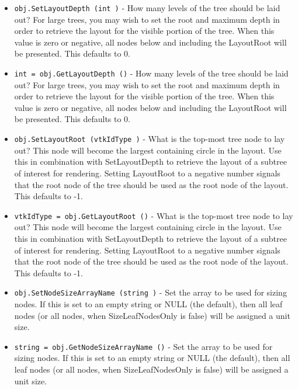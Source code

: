 \begin{itemize}
\item  \verb|obj.SetLayoutDepth (int )| -  How many levels of the tree should be laid out?
 For large trees, you may wish to set the root and maximum depth
 in order to retrieve the layout for the visible portion of the tree.
 When this value is zero or negative, all nodes below and including
 the LayoutRoot will be presented.
 This defaults to 0.

\item  \verb|int = obj.GetLayoutDepth ()| -  How many levels of the tree should be laid out?
 For large trees, you may wish to set the root and maximum depth
 in order to retrieve the layout for the visible portion of the tree.
 When this value is zero or negative, all nodes below and including
 the LayoutRoot will be presented.
 This defaults to 0.

\item  \verb|obj.SetLayoutRoot (vtkIdType )| -  What is the top-most tree node to lay out?
 This node will become the largest containing circle in the layout.
 Use this in combination with SetLayoutDepth to retrieve the
 layout of a subtree of interest for rendering.
 Setting LayoutRoot to a negative number signals that the root node
 of the tree should be used as the root node of the layout.
 This defaults to -1.

\item  \verb|vtkIdType = obj.GetLayoutRoot ()| -  What is the top-most tree node to lay out?
 This node will become the largest containing circle in the layout.
 Use this in combination with SetLayoutDepth to retrieve the
 layout of a subtree of interest for rendering.
 Setting LayoutRoot to a negative number signals that the root node
 of the tree should be used as the root node of the layout.
 This defaults to -1.

\item  \verb|obj.SetNodeSizeArrayName (string )| -  Set the array to be used for sizing nodes.
 If this is set to an empty string or NULL (the default),
 then all leaf nodes (or all nodes, when SizeLeafNodesOnly is false)
 will be assigned a unit size.

\item  \verb|string = obj.GetNodeSizeArrayName ()| -  Set the array to be used for sizing nodes.
 If this is set to an empty string or NULL (the default),
 then all leaf nodes (or all nodes, when SizeLeafNodesOnly is false)
 will be assigned a unit size.

\end{itemize}
